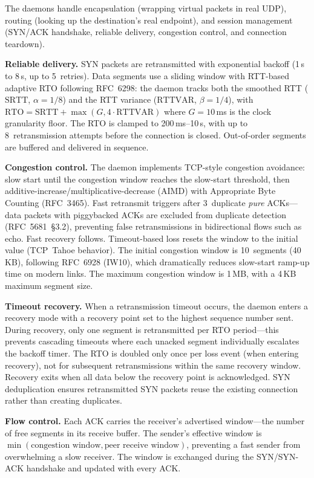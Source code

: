 \documentclass[11pt,a4paper]{article}
\begin{document}
The daemons handle encapsulation (wrapping virtual packets in real UDP), routing (looking up the destination's real endpoint), and session management (SYN/ACK handshake, reliable delivery, congestion control, and connection teardown).

\textbf{Reliable delivery.} SYN packets are retransmitted with exponential backoff (1\,s to 8\,s, up to 5~retries). Data segments use a sliding window with RTT-based adaptive RTO following RFC~6298: the daemon tracks both the smoothed RTT ($\text{SRTT}$, $\alpha = 1/8$) and the RTT variance ($\text{RTTVAR}$, $\beta = 1/4$), with $\text{RTO} = \text{SRTT} + \max(G, 4 \cdot \text{RTTVAR})$ where $G = 10$\,ms is the clock granularity floor. The RTO is clamped to 200\,ms--10\,s, with up to 8~retransmission attempts before the connection is closed. Out-of-order segments are buffered and delivered in sequence.

\textbf{Congestion control.} The daemon implements TCP-style congestion avoidance: slow start until the congestion window reaches the slow-start threshold, then additive-increase/multiplicative-decrease (AIMD) with Appropriate Byte Counting (RFC~3465). Fast retransmit triggers after 3~duplicate \emph{pure} ACKs---data packets with piggybacked ACKs are excluded from duplicate detection (RFC~5681~\S3.2), preventing false retransmissions in bidirectional flows such as echo. Fast recovery follows. Timeout-based loss resets the window to the initial value (TCP~Tahoe behavior). The initial congestion window is 10~segments (40\,KB), following RFC~6928 (IW10), which dramatically reduces slow-start ramp-up time on modern links. The maximum congestion window is 1\,MB, with a 4\,KB maximum segment size.

\textbf{Timeout recovery.} When a retransmission timeout occurs, the daemon enters a recovery mode with a recovery point set to the highest sequence number sent. During recovery, only one segment is retransmitted per RTO period---this prevents cascading timeouts where each unacked segment individually escalates the backoff timer. The RTO is doubled only once per loss event (when entering recovery), not for subsequent retransmissions within the same recovery window. Recovery exits when all data below the recovery point is acknowledged. SYN deduplication ensures retransmitted SYN packets reuse the existing connection rather than creating duplicates.

\textbf{Flow control.} Each ACK carries the receiver's advertised window---the number of free segments in its receive buffer. The sender's effective window is $\min(\text{congestion window}, \text{peer receive window})$, preventing a fast sender from overwhelming a slow receiver. The window is exchanged during the SYN/SYN-ACK handshake and updated with every ACK.
\end{document}
